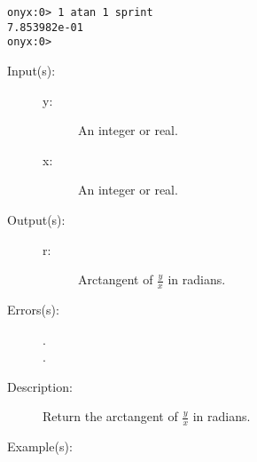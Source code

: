 \begin{description}
\begin{description}
\begin{verbatim}
onyx:0> 1 atan 1 sprint
7.853982e-01
onyx:0>
		\end{verbatim}
	\end{description}
\label{systemdict:atan2}
\item[{\onyxop{y x}{atan2}{r}}: ]
	\begin{description}\item[]
	\item[Input(s): ]
		\begin{description}\item[]
		\item[y: ]
			An integer or real.
		\item[x: ]
			An integer or real.
		\end{description}
	\item[Output(s): ]
		\begin{description}\item[]
		\item[r: ]
			Arctangent of $\frac{y}{x}$ in radians.
		\end{description}
	\item[Errors(s): ]
		\begin{description}\item[]
		\item[.]
		\item[.]
		\end{description}
	\item[Description: ]
		Return the arctangent of $\frac{y}{x}$ in radians.
	\item[Example(s): ]\begin{verbatim}


\end{verbatim}
\end{description}
\end{description}

